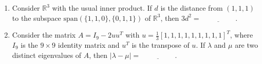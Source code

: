 \documentclass[journal]{IEEEtran}
\begin{document}
\begin{enumerate}
\vspace{0.5cm}
\item Consider $\mathbb{R}^3$ with the usual inner product. If $d$ is the distance from $(1, 1, 1)$ to the subspace $\text{span}(\{1, 1, 0\}, \{0, 1, 1\})$ of $\mathbb{R}^3$, then $3d^2 = \underline{\hspace{2cm}}$.
\vspace{0.5cm}
\item Consider the matrix $A = I_9 - 2u u^T$ with $u = \frac{1}{3} [1, 1, 1, 1, 1, 1, 1, 1, 1]^T$, where $I_9$ is the $9 \times 9$ identity matrix and $u^T$ is the transpose of $u$. If $\lambda$ and $\mu$ are two distinct eigenvalues of $A$, then
$|\lambda - \mu| = \underline{\hspace{2cm}}.$

\end{enumerate}
\end{document}

